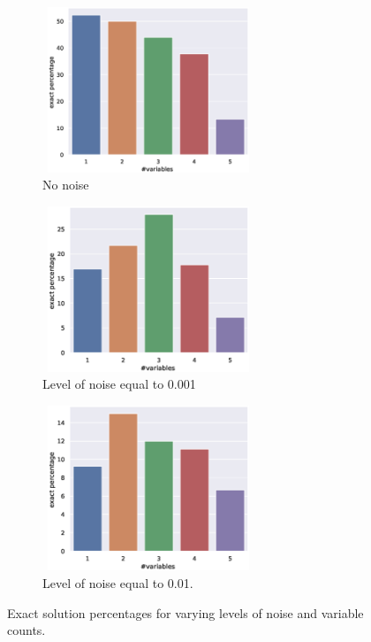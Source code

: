 \documentclass{bmcart}
\begin{document}
\begin{figure}[!h]
	
	\begin{subfigure}[b]{0.45\textwidth}
		\includegraphics[width=180pt,height=140pt]{plots/numvars_vs_exact_correct_no_noise.eps}
		\caption{No noise}
		\label{fig:noNoise}
	\end{subfigure}
	\hfill
	\begin{subfigure}[b]{0.45\textwidth}
		
		\includegraphics[width=180pt,height=140pt]{plots/numvars_vs_exact_correct_noise0_001.eps}
		\caption{Level of noise equal to 0.001}
		\label{fig:noise0.001}
	\end{subfigure}
	\centering
	\begin{subfigure}[b]{0.40\textwidth}
		\includegraphics[width=180pt,height=140pt]{plots/numvars_vs_exact_correct_noise0_01.eps}
		\caption{Level of noise equal to 0.01.}
		\label{fig:noise0.01}
	\end{subfigure}
	\caption{Exact solution percentages for varying levels of noise and variable counts.}
	\label{fig:compExact_noise_varcnt}
\end{figure}
\end{document}
